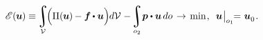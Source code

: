 \nopagebreak\vspace{-0.2em}
\begin{equation}\label{principleofminimumpotentialenergy.formulation}
\potentialenergyfunctional \hspace{.2ex} (\hspace{-0.1ex}\bm{u}\hspace{-0.1ex}) \equiv \hspace{-0.2ex}
\displaystyle\integral\displaylimits_{\mathcal{V}} \hspace{-0.4ex}
\Bigl(
\potentialenergydensity (\hspace{-0.1ex}\bm{u}\hspace{-0.1ex}) \hspace{-0.1ex} - \bm{f} \hspace{-0.1ex} \dotp \bm{u}
\Bigr) \hspace{-0.1ex} d\mathcal{V} \hspace{.1ex}
- \hspace{-0.3ex}
\displaystyle\integral\displaylimits_{o_2} \hspace{-0.4ex}
\bm{p} \dotp \bm{u} \hspace{.33ex} do \hspace{.2ex}
\hspace{.1ex}\to\hspace{.25ex} \mathrm{min}
\hspace{.15ex} , \hspace{.5em}
\bm{u} \hspace{.1ex} \bigr|_{o_1} \hspace{-0.8ex} = \hspace{.1ex} \bm{u}_{\raisemath{-0.1em}{0}}
\hspace{.16ex} .
\end{equation}


